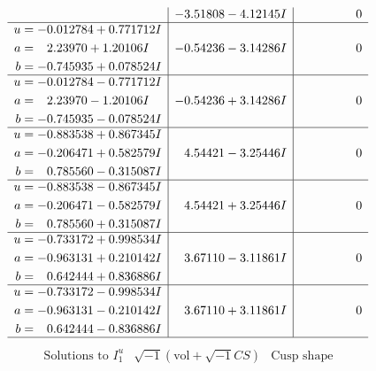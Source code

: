 \documentclass[1p]{elsarticle_modified}
\theoremstyle{definition}
\newcommand{\I}{\sqrt{-1}}
\begin{document}
$$\begin{array}{c|c|c}
 & -3.51808 - 4.12145 I & \phantom{-0.000000 } 0 \\ \hline\begin{aligned}
u &= -0.012784 + 0.771712 I \\
a &= \phantom{-}2.23970 + 1.20106 I \\
b &= -0.745935 + 0.078524 I\end{aligned}
 & -0.54236 - 3.14286 I & \phantom{-0.000000 } 0 \\ \hline\begin{aligned}
u &= -0.012784 - 0.771712 I \\
a &= \phantom{-}2.23970 - 1.20106 I \\
b &= -0.745935 - 0.078524 I\end{aligned}
 & -0.54236 + 3.14286 I & \phantom{-0.000000 } 0 \\ \hline\begin{aligned}
u &= -0.883538 + 0.867345 I \\
a &= -0.206471 + 0.582579 I \\
b &= \phantom{-}0.785560 - 0.315087 I\end{aligned}
 & \phantom{-}4.54421 - 3.25446 I & \phantom{-0.000000 } 0 \\ \hline\begin{aligned}
u &= -0.883538 - 0.867345 I \\
a &= -0.206471 - 0.582579 I \\
b &= \phantom{-}0.785560 + 0.315087 I\end{aligned}
 & \phantom{-}4.54421 + 3.25446 I & \phantom{-0.000000 } 0 \\ \hline\begin{aligned}
u &= -0.733172 + 0.998534 I \\
a &= -0.963131 + 0.210142 I \\
b &= \phantom{-}0.642444 + 0.836886 I\end{aligned}
 & \phantom{-}3.67110 - 3.11861 I & \phantom{-0.000000 } 0 \\ \hline\begin{aligned}
u &= -0.733172 - 0.998534 I \\
a &= -0.963131 - 0.210142 I \\
b &= \phantom{-}0.642444 - 0.836886 I\end{aligned}
 & \phantom{-}3.67110 + 3.11861 I & \phantom{-0.000000 } 0\\
 \hline 
 \end{array}$$\newpage$$\begin{array}{c|c|c}  
\text{Solutions to }I^u_{1}& \I (\text{vol} + \sqrt{-1}CS) & \text{Cusp shape}\\

\end{array}$$
\end{document}
